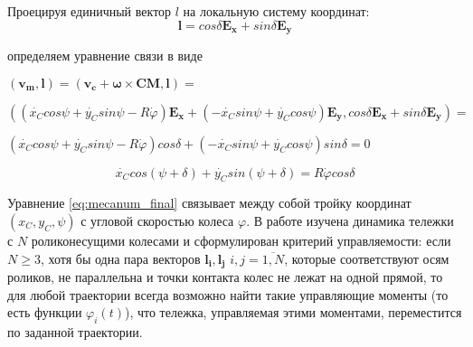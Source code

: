 \documentclass[oneside,final,14pt]{extreport}
\newcommand{\bs}{\boldsymbol}
\begin{document}
\begin{figure}[H]
\end{figure}

Проецируя единичный вектор $l$ на локальную систему координат: 
\begin{equation}
\bs{l}
=
cos\delta
\bs{E_{x}}
+
sin\delta
\bs{E_{y}}
\end{equation}

определяем уравнение связи в виде
\begin{flushleft}
$
(
\bs{v_{m}}
,
\bs{l}
)
=
(
\bs{v_{c}}
+
\bs{\omega}
\times
\bs{CM}
,
\bs{l}
)
=
$

$
(
(
\dot{x_{C}}
cos\psi
+
\dot{y_{C}}
sin\psi
-R\dot{\varphi}
)
\bs{E_{x}}
+
(
-\dot{x_{C}}
sin\psi
+
\dot{y_{C}}
cos\psi
)
\bs{E_{y}}
,
cos\delta
\bs{E_{x}}
+
sin\delta
\bs{E_{y}}
)
=
$

$
(
\dot{x_{C}}
cos\psi
+
\dot{y_{C}}
sin\psi
-R\dot{\varphi}
)
cos\delta
+
(
-\dot{x_{C}}
sin\psi
+
\dot{y_{C}}
cos\psi
)
sin\delta
=
0
$
\end{flushleft}
\begin{equation}
\label{eq:mecanum_final}
\dot{x_{C}}
cos(\psi+\delta)
+
\dot{y_{C}}
sin(\psi+\delta)
=
R\dot{\varphi}
cos\delta
\end{equation}

Уравнение \ref{eq:mecanum_final} связывает между собой тройку координат $(x_{C},y_{C},\psi)$ с угловой скоростью колеса $\varphi$. В работе \cite{MecanumWheelCartDynamic} изучена динамика тележки с $N$ роликонесущими колесами и сформулирован критерий управляемости:
если $N \geq 3$, хотя бы одна пара векторов  $\bs{l_{i}}, \bs{l_{j}}$ $i,j=\overline{1,N}$, которые соответствуют осям роликов, не параллельна и точки контакта колес не лежат на одной прямой, то для любой траектории всегда возможно найти такие управляющие моменты (то есть функции $\varphi_{i}(t)$), что тележка, управляемая этими моментами, переместится по заданной траектории.
\end{document}

